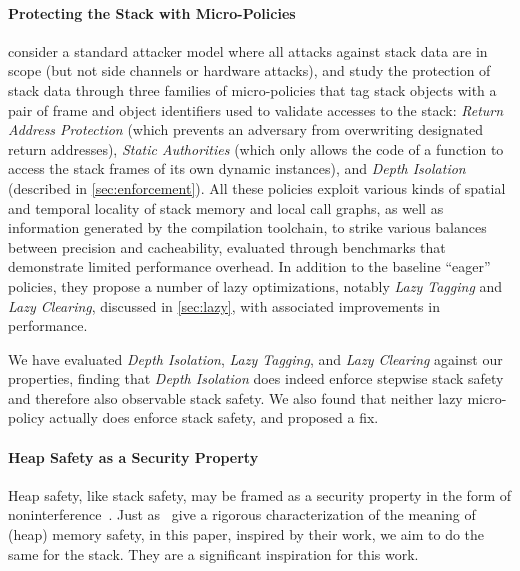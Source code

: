 \documentclass[acmsmall,review,anonymous]{acmart}\settopmatter{printfolios=true,printccs=false,printacmref=false}
\begin{document}
{\paragraph{Protecting the Stack with Micro-Policies}
%
\citet{DBLP:conf/sp/RoesslerD18} consider a standard attacker model where all
attacks against stack data are in scope (but not side channels or hardware
attacks), and study the protection of stack data through three families of
micro-policies that tag stack objects with a pair of frame and object identifiers
used to validate accesses to the stack: {\em Return Address Protection} (which
prevents an adversary from overwriting designated return addresses), {\em Static
Authorities} (which only allows the code of a function to access the stack frames
of its own dynamic instances), and {\em Depth Isolation} (described in
\cref{sec:enforcement}). All these policies exploit various kinds of spatial and
temporal locality of stack memory and local call graphs, as well as information
generated by the compilation toolchain, to strike various balances between
precision and cacheability, evaluated through benchmarks that demonstrate
limited performance overhead. In addition to the baseline ``eager'' policies,
they propose a number of lazy optimizations, notably {\em Lazy Tagging} and
{\em Lazy
Clearing}, discussed in \cref{sec:lazy}, with associated improvements in
performance.

We have evaluated {\em Depth Isolation}, {\em Lazy Tagging}, and {\em Lazy
  Clearing} against our properties, finding that {\em Depth Isolation} does
indeed enforce stepwise stack safety and therefore also observable stack
safety. We also found that neither lazy micro-policy actually does enforce
stack safety, and proposed a fix.

\paragraph{Heap Safety as a Security Property}

Heap safety, like stack safety, may be framed as a security property
in the form of
noninterference~\citep{DBLP:conf/post/AmorimHP18}\ifaftersubmission{}\fi. Just
as~\citeauthor{DBLP:conf/post/AmorimHP18} give a rigorous
characterization of the meaning of (heap) memory safety, in this paper,
inspired by their work, we aim to do the same for the stack. They are a
significant inspiration for this work.

}
\end{document}
